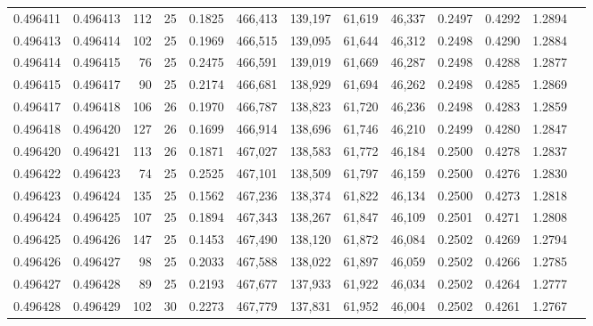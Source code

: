 \begin{tabular}{rrrrrrrrrrrrr}
0.496411 & 0.496413 & 112 &  25 &                                     0.1825 & 466,413 & 139,197 &  61,619 &  46,337 & 0.2497 & 0.4292 & 1.2894 \\
0.496413 & 0.496414 & 102 &  25 &                                     0.1969 & 466,515 & 139,095 &  61,644 &  46,312 & 0.2498 & 0.4290 & 1.2884 \\
0.496414 & 0.496415 &  76 &  25 &                                     0.2475 & 466,591 & 139,019 &  61,669 &  46,287 & 0.2498 & 0.4288 & 1.2877 \\
0.496415 & 0.496417 &  90 &  25 &                                     0.2174 & 466,681 & 138,929 &  61,694 &  46,262 & 0.2498 & 0.4285 & 1.2869 \\
0.496417 & 0.496418 & 106 &  26 &                                     0.1970 & 466,787 & 138,823 &  61,720 &  46,236 & 0.2498 & 0.4283 & 1.2859 \\
0.496418 & 0.496420 & 127 &  26 &                                     0.1699 & 466,914 & 138,696 &  61,746 &  46,210 & 0.2499 & 0.4280 & 1.2847 \\
0.496420 & 0.496421 & 113 &  26 &                                     0.1871 & 467,027 & 138,583 &  61,772 &  46,184 & 0.2500 & 0.4278 & 1.2837 \\
0.496422 & 0.496423 &  74 &  25 &                                     0.2525 & 467,101 & 138,509 &  61,797 &  46,159 & 0.2500 & 0.4276 & 1.2830 \\
0.496423 & 0.496424 & 135 &  25 &                                     0.1562 & 467,236 & 138,374 &  61,822 &  46,134 & 0.2500 & 0.4273 & 1.2818 \\
0.496424 & 0.496425 & 107 &  25 &                                     0.1894 & 467,343 & 138,267 &  61,847 &  46,109 & 0.2501 & 0.4271 & 1.2808 \\
0.496425 & 0.496426 & 147 &  25 &                                     0.1453 & 467,490 & 138,120 &  61,872 &  46,084 & 0.2502 & 0.4269 & 1.2794 \\
0.496426 & 0.496427 &  98 &  25 &                                     0.2033 & 467,588 & 138,022 &  61,897 &  46,059 & 0.2502 & 0.4266 & 1.2785 \\
0.496427 & 0.496428 &  89 &  25 &                                     0.2193 & 467,677 & 137,933 &  61,922 &  46,034 & 0.2502 & 0.4264 & 1.2777 \\
0.496428 & 0.496429 & 102 &  30 &                                     0.2273 & 467,779 & 137,831 &  61,952 &  46,004 & 0.2502 & 0.4261 & 1.2767 \\

\end{tabular}
